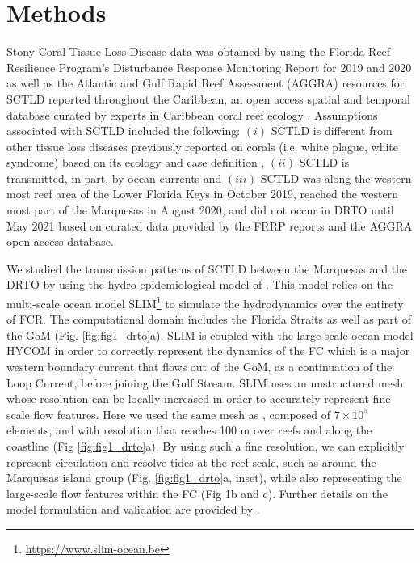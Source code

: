 \section{Methods}
Stony Coral Tissue Loss Disease data was obtained by using the Florida Reef Resilience Program's Disturbance Response Monitoring Report for 2019 and 2020 \citep{frrp2019,frrp2020} as well as the Atlantic and Gulf Rapid Reef Assessment (AGGRA) resources for SCTLD reported throughout the Caribbean, an open access spatial and temporal database curated by experts in Caribbean coral reef ecology \citep{kramer2019map}. Assumptions associated with SCTLD included the following: $(i)$ SCTLD is different from other tissue loss diseases previously reported on corals (i.e. white plague, white syndrome) based on its ecology and case definition \citep{noaa2018}, $(ii)$ SCTLD is transmitted, in part, by ocean currents \citep{aeby2019pathogenesis, muller2020spatial,eaton2021measuring} and $(iii)$ SCTLD was along the western most reef area of the Lower Florida Keys in October 2019, reached the western most part of the Marquesas in August 2020, and did not occur in DRTO until May 2021 based on curated data provided by the FRRP reports and the AGGRA open access database.

We studied the transmission patterns of SCTLD between the Marquesas and the DRTO by using the hydro-epidemiological model of \cite{dobbelaere2020coupled}. This model relies on the multi-scale ocean model SLIM\footnote{\url{ https://www.slim-ocean.be}} to simulate the hydrodynamics over the entirety of FCR. The computational domain includes the Florida Straits as well as part of the GoM (Fig. \ref{fig:fig1_drto}a). SLIM is coupled with the large-scale ocean model HYCOM in order to correctly represent the dynamics of the FC which is a major western boundary current that flows out of the GoM, as a continuation of the Loop Current, before joining the Gulf Stream. SLIM uses an unstructured mesh whose resolution can be locally increased in order to accurately represent fine-scale flow features. Here we used the same mesh as \cite{dobbelaere2020coupled}, composed of $7\times 10^5$ elements, and with resolution that reaches 100 m over reefs and along the coastline (Fig \ref{fig:fig1_drto}a). By using such a fine resolution, we can explicitly represent circulation and resolve tides at the reef scale, such as around the Marquesas island group (Fig. \ref{fig:fig1_drto}a, inset), while also representing the large-scale flow features within the FC (Fig 1b and c). Further details on the model formulation and validation are provided by \cite{frys2020fine}.


